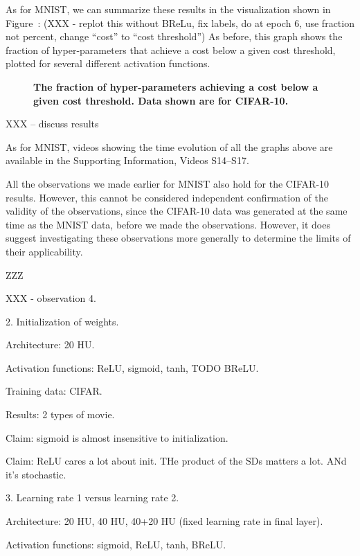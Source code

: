 \documentclass[10pt]{article}
\begin{document}
As for MNIST, we can summarize these results in the visualization
shown in Figure~\label{fig:fraction_CIFAR}: (XXX - replot this without
BReLu, fix labels, do at epoch 6, use fraction not percent, change
``cost'' to ``cost threshold'') As before, this graph shows the
fraction of hyper-parameters that achieve a cost below a given cost
threshold, plotted for several different activation functions.

\begin{figure}[!ht]
\begin{center}
\end{center}
\caption{ {\bf The fraction of hyper-parameters achieving a cost below
    a given cost threshold.  Data shown are for CIFAR-10.}}
\label{fig:fraction_CIFAR}
\end{figure}

XXX -- discuss results

As for MNIST, videos showing the time evolution of all the graphs
above are available in the Supporting Information, Videos S14--S17.

All the observations we made earlier for MNIST also hold for the
CIFAR-10 results.  However, this cannot be considered independent
confirmation of the validity of the observations, since the CIFAR-10
data was generated at the same time as the MNIST data, before we made
the observations.  However, it does suggest investigating these
observations more generally to determine the limits of their
applicability.

ZZZ


XXX - observation 4.


2. Initialization of weights.

Architecture: 20 HU.

Activation functions: ReLU, sigmoid, tanh, TODO BReLU.

Training data: CIFAR.

Results: 2 types of movie. 

Claim: sigmoid is almost insensitive to initialization.

Claim: ReLU cares a lot about init.  THe product of the SDs matters a
lot.  ANd it's stochastic.




3. Learning rate 1 versus learning rate 2.

Architecture: 20 HU, 40 HU, 40+20 HU (fixed learning rate in final
layer).

Activation functions: sigmoid, ReLU, tanh, BReLU.
\end{document}
